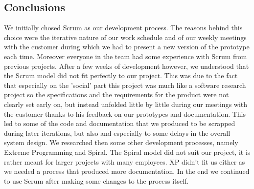 \subsection{Conclusions}
We initially chosed Scrum as our development process. The reasons behind this choice were the iterative nature
of our work schedule and of our weekly meetings with the customer during which we had to present a new version
of the prototype each time. Moreover everyone in the team had some experience with Scrum from previous projects.
After a few weeks of development however, we understood that the Scrum model did not fit perfectly to our project.
This was due to the fact that especially on the 'social' part this project was much like a software research project
so the specifications and the requirements for the product were not clearly set early on, but instead unfolded little
by little during our meetings with the customer thanks to his feedback on our prototypes and documentation.
This led to some of the code and documentation that we produced to be scrapped during later iterations,
but also and especially to some delays in the overall system design. We researched then some other development
processes, namely Extreme Programming and Spiral. The Spiral model did not suit our project, it is rather meant
for larger projects with many employees. XP didn't fit us either as we needed a process that produced more documentation.
In the end we continued to use Scrum after making some changes to the process itself.

